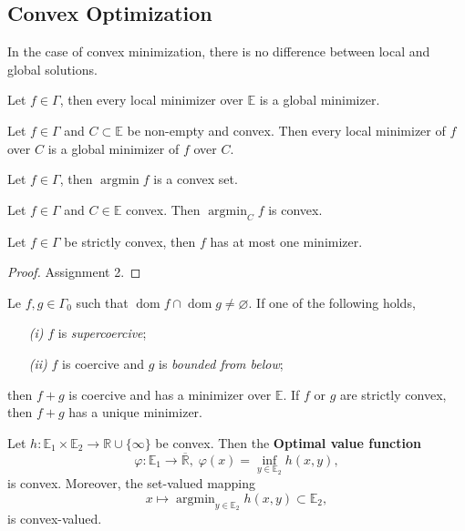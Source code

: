 \documentclass{tufte-handout}
\DeclareMathOperator{\dom}{dom}
\DeclareMathOperator{\argmin}{argmin}
\begin{document}
{    \subsection{Convex Optimization}%
      \label{sub:Convex Optimization}
      In the case of convex minimization, there is no difference between local and global solutions. 
      \begin{proposition} \label{label}
        Let $f\in \Gamma$, then every local minimizer over $\mathbb{E}$ is a global minimizer. 
      \end{proposition}
      \begin{corollary}
        Let $f \in \Gamma$ and $C \subset \mathbb{E}$ be non-empty and convex. Then every local minimizer of $f$ over $C$ is a global minimizer of $f$ over $C.$
      \end{corollary}
      \begin{proposition} \label{label}
        Let $f \in \Gamma$, then $\argmin f$ is a convex set. 
      \end{proposition}
      \begin{corollary} Let $f \in \Gamma$ and $C \in \mathbb{E}$ convex. Then $\argmin_C f$ is convex. 
      \end{corollary}
      \begin{proposition}
        Let $f \in \Gamma$ be strictly convex, then $f$ has at most one minimizer. 
        \begin{proof} 
          Assignment 2.
        \end{proof}
      \end{proposition}
      \begin{proposition}
        Le $f, g \in \Gamma_0$ such that $\dom f \cap \dom g \neq \varnothing.$ If one of the following holds, 
        \begin{enumerate}
          \item[\it (i)] $f$ is \textit{supercoercive};
          \item[\it (ii)] $f$ is coercive and $g$ is \textit{bounded from below}; 
        \end{enumerate}
        then $f+g$ is coercive and has a minimizer over $\mathbb{E}$. If $f$ or $g$ are strictly convex, then $f+g$ has a unique minimizer. 
      \end{proposition}
      \begin{theorem}
        Let $h: \mathbb{E}_1 \times \mathbb{E}_2 \to \mathbb{R}\cup \{\infty\} $ be convex. Then the \textbf{Optimal value function}
        $$\varphi:\mathbb{E}_1 \to \overline{\mathbb{R}}, \; \varphi(x) = \inf_{y \in \mathbb{E}_2} h(x,y) ,$$
        is convex. Moreover, the set-valued mapping 
        $$x \mapsto \argmin_{y \in \mathbb{E}_2} h(x,y) \subset \mathbb{E}_2, $$
        is convex-valued.
      \end{theorem}
}
\end{document}
